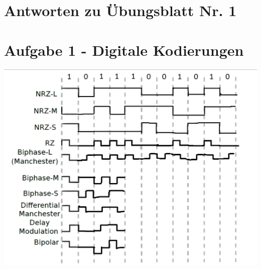 \documentclass{scrartcl}
\begin{document}
\section*{Antworten zu Übungsblatt Nr. 1}


\section*{Aufgabe 1 - Digitale Kodierungen}
\includegraphics[width=14cm]{Codierungen.png}
\end{document}
